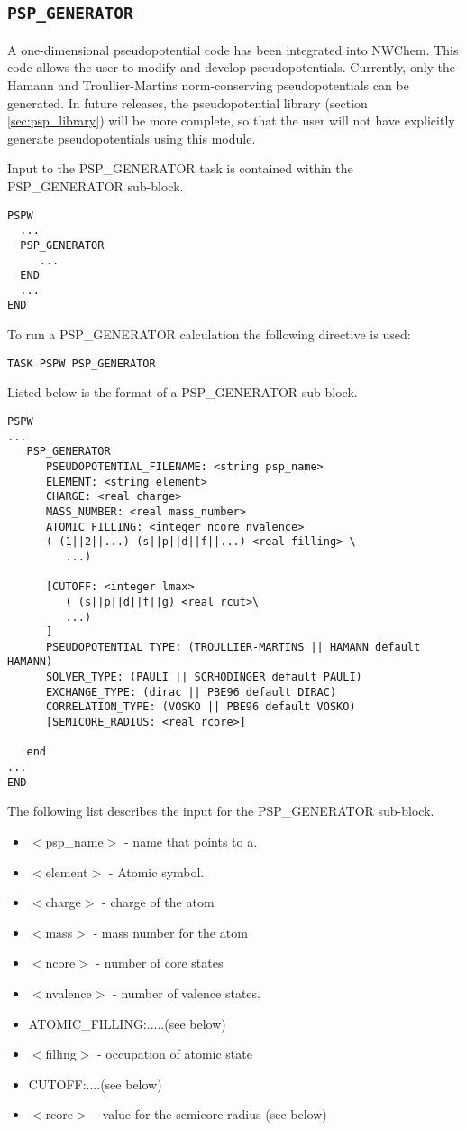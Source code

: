 \subsection{\tt PSP\_GENERATOR}
\label{sec:pspw_psp_generator}
A one-dimensional pseudopotential code has been integrated into NWChem.
This code allows the user to modify and develop pseudopotentials.  Currently, 
only the Hamann and Troullier-Martins norm-conserving pseudopotentials can be
generated.  In future releases, the pseudopotential library (section \ref{sec:psp_library})
will be more complete, so that the user will not have explicitly generate
pseudopotentials using this module.

Input to the PSP\_GENERATOR task is contained within the
PSP\_GENERATOR  sub-block.
\begin{verbatim}
PSPW
  ...
  PSP_GENERATOR
     ...
  END
  ...
END
\end{verbatim}
To run a PSP\_GENERATOR calculation the following directive 
is used:
\begin{verbatim}
TASK PSPW PSP_GENERATOR
\end{verbatim}
Listed below is the format of a PSP\_GENERATOR sub-block.
\begin{verbatim}
PSPW
... 
   PSP_GENERATOR
      PSEUDOPOTENTIAL_FILENAME: <string psp_name>
      ELEMENT: <string element>
      CHARGE: <real charge>
      MASS_NUMBER: <real mass_number>
      ATOMIC_FILLING: <integer ncore nvalence>
      ( (1||2||...) (s||p||d||f||...) <real filling> \
         ...)
      
      [CUTOFF: <integer lmax> 
         ( (s||p||d||f||g) <real rcut>\
         ...)
      ]
      PSEUDOPOTENTIAL_TYPE: (TROULLIER-MARTINS || HAMANN default HAMANN)
      SOLVER_TYPE: (PAULI || SCRHODINGER default PAULI)
      EXCHANGE_TYPE: (dirac || PBE96 default DIRAC)
      CORRELATION_TYPE: (VOSKO || PBE96 default VOSKO)
      [SEMICORE_RADIUS: <real rcore>]
      
   end
... 
END
\end{verbatim}
The following list describes the input for the PSP\_GENERATOR
sub-block.
\begin{itemize}

        \item $<$psp\_name$>$ - name that points to a.
        \item $<$element$>$ - Atomic symbol.
        \item $<$charge$>$ - charge of the atom
        \item $<$mass$>$ - mass number for the atom
        \item $<$ncore$>$ - number of core states
        \item $<$nvalence$>$ - number of valence states.
        \item ATOMIC\_FILLING:.....(see below)
        \item $<$filling$>$ - occupation of atomic state
        \item CUTOFF:....(see below) 
        \item $<$rcore$>$ - value for the semicore radius (see below) 
\end{itemize}


